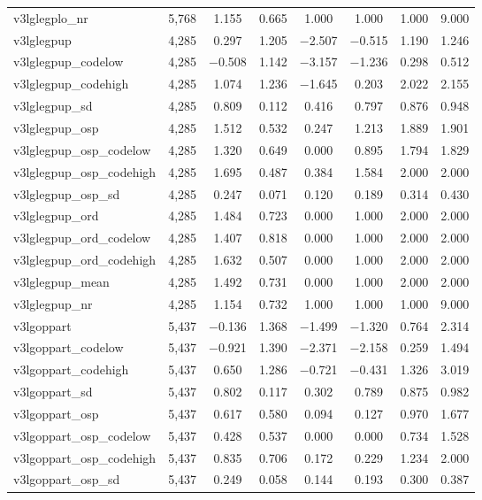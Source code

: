 \begin{table}[!htbp]
\begin{tabular}{@{\extracolsep{5pt}}lccccccc}
v3lglegplo\_nr & 5,768 & 1.155 & 0.665 & 1.000 & 1.000 & 1.000 & 9.000 \\ 
v3lglegpup & 4,285 & 0.297 & 1.205 & $-$2.507 & $-$0.515 & 1.190 & 1.246 \\ 
v3lglegpup\_codelow & 4,285 & $-$0.508 & 1.142 & $-$3.157 & $-$1.236 & 0.298 & 0.512 \\ 
v3lglegpup\_codehigh & 4,285 & 1.074 & 1.236 & $-$1.645 & 0.203 & 2.022 & 2.155 \\ 
v3lglegpup\_sd & 4,285 & 0.809 & 0.112 & 0.416 & 0.797 & 0.876 & 0.948 \\ 
v3lglegpup\_osp & 4,285 & 1.512 & 0.532 & 0.247 & 1.213 & 1.889 & 1.901 \\ 
v3lglegpup\_osp\_codelow & 4,285 & 1.320 & 0.649 & 0.000 & 0.895 & 1.794 & 1.829 \\ 
v3lglegpup\_osp\_codehigh & 4,285 & 1.695 & 0.487 & 0.384 & 1.584 & 2.000 & 2.000 \\ 
v3lglegpup\_osp\_sd & 4,285 & 0.247 & 0.071 & 0.120 & 0.189 & 0.314 & 0.430 \\ 
v3lglegpup\_ord & 4,285 & 1.484 & 0.723 & 0.000 & 1.000 & 2.000 & 2.000 \\ 
v3lglegpup\_ord\_codelow & 4,285 & 1.407 & 0.818 & 0.000 & 1.000 & 2.000 & 2.000 \\ 
v3lglegpup\_ord\_codehigh & 4,285 & 1.632 & 0.507 & 0.000 & 1.000 & 2.000 & 2.000 \\ 
v3lglegpup\_mean & 4,285 & 1.492 & 0.731 & 0.000 & 1.000 & 2.000 & 2.000 \\ 
v3lglegpup\_nr & 4,285 & 1.154 & 0.732 & 1.000 & 1.000 & 1.000 & 9.000 \\ 
v3lgoppart & 5,437 & $-$0.136 & 1.368 & $-$1.499 & $-$1.320 & 0.764 & 2.314 \\ 
v3lgoppart\_codelow & 5,437 & $-$0.921 & 1.390 & $-$2.371 & $-$2.158 & 0.259 & 1.494 \\ 
v3lgoppart\_codehigh & 5,437 & 0.650 & 1.286 & $-$0.721 & $-$0.431 & 1.326 & 3.019 \\ 
v3lgoppart\_sd & 5,437 & 0.802 & 0.117 & 0.302 & 0.789 & 0.875 & 0.982 \\ 
v3lgoppart\_osp & 5,437 & 0.617 & 0.580 & 0.094 & 0.127 & 0.970 & 1.677 \\ 
v3lgoppart\_osp\_codelow & 5,437 & 0.428 & 0.537 & 0.000 & 0.000 & 0.734 & 1.528 \\ 
v3lgoppart\_osp\_codehigh & 5,437 & 0.835 & 0.706 & 0.172 & 0.229 & 1.234 & 2.000 \\ 
v3lgoppart\_osp\_sd & 5,437 & 0.249 & 0.058 & 0.144 & 0.193 & 0.300 & 0.387 \\ 

\end{tabular}
\end{table}
